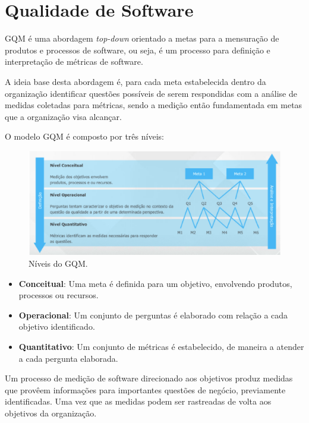 \section{Qualidade de Software}

GQM é uma abordagem \textit{top-down} orientado a metas para a mensuração de produtos e processos de software, ou seja, é um processo para definição e interpretação de métricas de software. \cite{junior}

A ideia base desta abordagem é, para cada meta estabelecida dentro da organização identificar questões possíveis de serem respondidas com a análise de medidas coletadas para métricas, sendo a medição então fundamentada em metas que a organização visa alcançar.

O modelo GQM é composto por três níveis:

\begin{figure}[h!]
	\centering
  \includegraphics[keepaspectratio=true,scale=0.5]{figuras/gqm.eps}
  \caption{Níveis do GQM. \cite{junior}}
	\label{fig:gqm}
\end{figure}

\begin{itemize}
  \item \textbf{Conceitual}: Uma meta é definida para um objetivo, envolvendo produtos, processos ou recursos.
  \item \textbf{Operacional}: Um conjunto de perguntas é elaborado com relação a cada objetivo identificado.
  \item \textbf{Quantitativo}: Um conjunto de métricas é estabelecido, de maneira a atender a cada pergunta elaborada.
\end{itemize}

Um processo de medição de software direcionado aos objetivos produz medidas que provêem informações para importantes questões de negócio, previamente identificadas. Uma vez que as medidas podem ser rastreadas de volta aos objetivos da organização.
